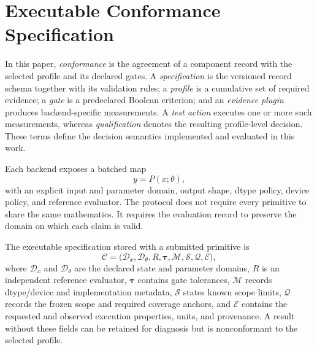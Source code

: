 \documentclass[preprint,12pt]{elsarticle}
\begin{document}
\section{Executable Conformance Specification}
In this paper, \emph{conformance} is the agreement of a component record with the selected profile and its declared gates. A \emph{specification} is the versioned record schema together with its validation rules; a \emph{profile} is a cumulative set of required evidence; a \emph{gate} is a predeclared Boolean criterion; and an \emph{evidence plugin} produces backend-specific measurements. A \emph{test action} executes one or more such measurements, whereas \emph{qualification} denotes the resulting profile-level decision. These terms define the decision semantics implemented and evaluated in this work.

Each backend exposes a batched map
\begin{equation}
    y=P(x;\theta),
\end{equation}
with an explicit input and parameter domain, output shape, dtype policy, device policy, and reference evaluator. The protocol does not require every primitive to share the same mathematics. It requires the evaluation record to preserve the domain on which each claim is valid.

The executable specification stored with a submitted primitive is
\begin{equation}
  \mathcal{C}=\bigl(\mathcal{D}_{x},\mathcal{D}_{\theta},R,
  \boldsymbol{\tau},\mathcal{M},\mathcal{S},\mathcal{Q},\mathcal{E}\bigr),
\end{equation}
where $\mathcal{D}_{x}$ and $\mathcal{D}_{\theta}$ are the declared state and parameter domains, $R$ is an independent reference evaluator, $\boldsymbol{\tau}$ contains gate tolerances, $\mathcal{M}$ records dtype/device and implementation metadata, $\mathcal{S}$ states known scope limits, $\mathcal{Q}$ records the frozen scope and required coverage anchors, and $\mathcal{E}$ contains the requested and observed execution properties, units, and provenance. A result without these fields can be retained for diagnosis but is nonconformant to the selected profile.
\end{document}
